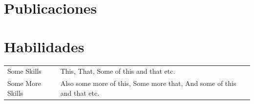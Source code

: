 \documentclass[a4paper,12pt]{article}
\begin{document}
\section{Publicaciones}
\begin{refsection}
\nocite{*}
\printbibliography[heading=none]
\end{refsection}

\section{Habilidades}
\begin{tabularx}{\linewidth}{@{}l X@{}}
Some Skills &  \normalsize{This, That, Some of this and that etc.}\\
Some More Skills  &  \normalsize{Also some more of this, Some more that, And some of this and that etc.}\\  
\end{tabularx}

\vfill
{}
\end{document}
